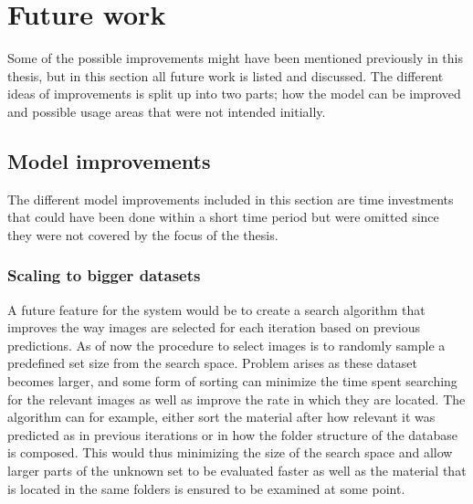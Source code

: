 \section{Future work}
\label{sec:concl:future}
Some of the possible improvements might have been mentioned previously in this thesis, but in this section all future work is listed and discussed.
The different ideas of improvements is split up into two parts; how the model can be improved and possible usage areas that were not intended initially.

\subsection{Model improvements}
\label{sec:conc:future:model}
The different model improvements included in this section are time investments that could have been done within a  short time period but were omitted since they were not covered by the focus of the thesis.

\subsubsection{Scaling to bigger datasets}
\label{sec:conc:future:model:data}

A future feature for the system would be to create a search algorithm that improves the way images are selected for each iteration based on previous predictions.
As of now the procedure to select images is to randomly sample a predefined set size from the search space. 
Problem arises as these dataset becomes larger, and some form of sorting can minimize the time spent searching for the relevant images as well as improve the rate in which they are located. 
The algorithm can for example, either sort the material after how relevant it was predicted as in previous iterations or in how the folder structure of the database is composed. This would thus minimizing the size of the search space and allow larger parts of the unknown set to be evaluated faster as well as the material that is located in the same folders is ensured to be examined at some point.

